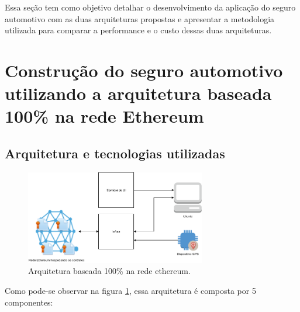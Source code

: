 Essa seção tem como objetivo detalhar o desenvolvimento da aplicação do seguro automotivo com as duas arquiteturas propostas e apresentar a metodologia utilizada para comparar a performance e o custo dessas duas arquiteturas.

\section{Construção do seguro automotivo utilizando a arquitetura baseada 100\% na rede Ethereum}

\subsection{Arquitetura e tecnologias utilizadas}

\begin{figure}[h]
\centering
\includegraphics[width=0.7\textwidth]{Cap2/full_ethereum_architecture.png}
\caption{Arquitetura baseada 100\% na rede ethereum.}
\label{full_ethereum_architecture}
\end{figure}

Como pode-se observar na figura \ref{full_ethereum_architecture}, essa arquitetura é composta por 5 componentes:

